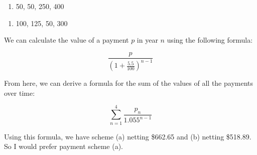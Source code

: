 \documentclass{article}
\begin{document}
\begin{enumerate}
          \begin{enumerate}[label=(\alph*)]
              \item 50, 50, 250, 400
          \end{enumerate}
          \begin{enumerate}[resume]
              \item 100, 125, 50, 300
          \end{enumerate}

          We can calculate the value of a payment $p$ in year $n$ using the following formula:

          \[\frac{p}{(1 + \frac{5.5}{100})^{n-1}}\]

          From here, we can derive a formula for the sum of the values of all the payments over time:

          \[\sum_{n=1}^{4}\frac{p_n}{1.055^{n-1}}\]

          Using this formula, we have scheme (a) netting \$662.65 and (b) netting \$518.89. So I would prefer payment scheme (a).
\end{enumerate}
\end{document}
